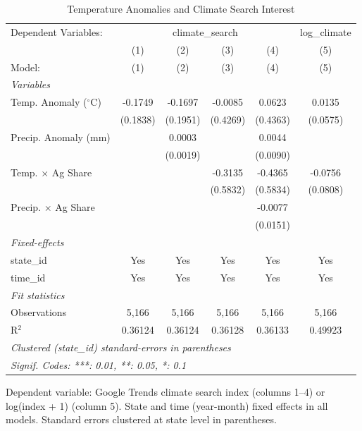
\begin{table}[htbp]
   \caption{\label{tab:primary} Temperature Anomalies and Climate Search Interest}
   \centering
   \begin{tabular}{lccccc}
      \tabularnewline \midrule \midrule
      Dependent Variables: & \multicolumn{4}{c}{climate\_search} & log\_climate\\
                                 & (1)      & (2)      & (3)      & (4)      & (5) \\   
      Model:                     & (1)      & (2)      & (3)      & (4)      & (5)\\  
      \midrule
      \emph{Variables}\\
      Temp. Anomaly ($^\circ$C)  & -0.1749  & -0.1697  & -0.0085  & 0.0623   & 0.0135\\   
                                 & (0.1838) & (0.1951) & (0.4269) & (0.4363) & (0.0575)\\   
      Precip. Anomaly (mm)       &          & 0.0003   &          & 0.0044   &   \\   
                                 &          & (0.0019) &          & (0.0090) &   \\   
      Temp. $\times$ Ag Share    &          &          & -0.3135  & -0.4365  & -0.0756\\   
                                 &          &          & (0.5832) & (0.5834) & (0.0808)\\   
      Precip. $\times$ Ag Share  &          &          &          & -0.0077  &   \\   
                                 &          &          &          & (0.0151) &   \\   
      \midrule
      \emph{Fixed-effects}\\
      state\_id                  & Yes      & Yes      & Yes      & Yes      & Yes\\  
      time\_id                   & Yes      & Yes      & Yes      & Yes      & Yes\\  
      \midrule
      \emph{Fit statistics}\\
      Observations               & 5,166    & 5,166    & 5,166    & 5,166    & 5,166\\  
      R$^2$                      & 0.36124  & 0.36124  & 0.36128  & 0.36133  & 0.49923\\  
      \midrule \midrule
      \multicolumn{6}{l}{\emph{Clustered (state\_id) standard-errors in parentheses}}\\
      \multicolumn{6}{l}{\emph{Signif. Codes: ***: 0.01, **: 0.05, *: 0.1}}\\
   \end{tabular}
   
   \par \raggedright 
   Dependent variable: Google Trends climate search index (columns 1--4) or log(index + 1) (column 5). State and time (year-month) fixed effects in all models. Standard errors clustered at state level in parentheses.
\end{table}


